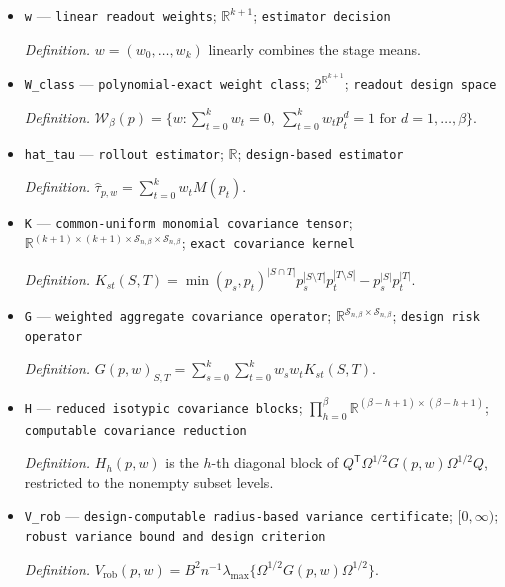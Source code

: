 \documentclass{article}
\begin{document}
\begin{itemize}
  \par\smallskip\noindent\emph{Definition.} \(\tau=n^{-1}\sum_{i\in I_n}\{Y_i(\mathbf 1)-Y_i(\mathbf 0)\}=m(1)-m(0)\).
  \item \texttt{w} --- \texttt{linear readout weights}; \(\mathbb R^{k+1}\); \texttt{estimator decision}
  \par\smallskip\noindent\emph{Definition.} \(w=(w_0,\ldots,w_k)\) linearly combines the stage means.
  \item \texttt{W\_\allowbreak{}class} --- \texttt{polynomial-\allowbreak{}exact weight class}; \(2^{\mathbb R^{k+1}}\); \texttt{readout design space}
  \par\smallskip\noindent\emph{Definition.} \(\mathcal W_\beta(p)=\{w:\sum_{t=0}^kw_t=0,\ \sum_{t=0}^kw_tp_t^d=1\text{ for }d=1,\ldots,\beta\}\).
  \item \texttt{hat\_\allowbreak{}tau} --- \texttt{rollout estimator}; \(\mathbb R\); \texttt{design-\allowbreak{}based estimator}
  \par\smallskip\noindent\emph{Definition.} \(\widehat\tau_{p,w}=\sum_{t=0}^k w_tM(p_t)\).
  \item \texttt{K} --- \texttt{common-\allowbreak{}uniform monomial covariance tensor}; \(\mathbb R^{(k+1)\times(k+1)\times\mathcal S_{n,\beta}\times\mathcal S_{n,\beta}}\); \texttt{exact covariance kernel}
  \par\smallskip\noindent\emph{Definition.} \(K_{st}(S,T)=\min(p_s,p_t)^{|S\cap T|}p_s^{|S\setminus T|}p_t^{|T\setminus S|}-p_s^{|S|}p_t^{|T|}\).
  \item \texttt{G} --- \texttt{weighted aggregate covariance operator}; \(\mathbb R^{\mathcal S_{n,\beta}\times\mathcal S_{n,\beta}}\); \texttt{design risk operator}
  \par\smallskip\noindent\emph{Definition.} \(G(p,w)_{S,T}=\sum_{s=0}^k\sum_{t=0}^k w_sw_tK_{st}(S,T)\).
  \item \texttt{H} --- \texttt{reduced isotypic covariance blocks}; \(\prod_{h=0}^{\beta}\mathbb R^{(\beta-h+1)\times(\beta-h+1)}\); \texttt{computable covariance reduction}
  \par\smallskip\noindent\emph{Definition.} \(H_h(p,w)\) is the \(h\)-th diagonal block of \(Q^{\mathsf T}\Omega^{1/2}G(p,w)\Omega^{1/2}Q\), restricted to the nonempty subset levels.
  \item \texttt{V\_\allowbreak{}rob} --- \texttt{design-\allowbreak{}computable radius-\allowbreak{}based variance certificate}; \([0,\infty)\); \texttt{robust variance bound and design criterion}
  \par\smallskip\noindent\emph{Definition.} \(V_{\mathrm{rob}}(p,w)=B^2n^{-1}\lambda_{\max}\{\Omega^{1/2}G(p,w)\Omega^{1/2}\}\).

\end{itemize}
\end{document}
